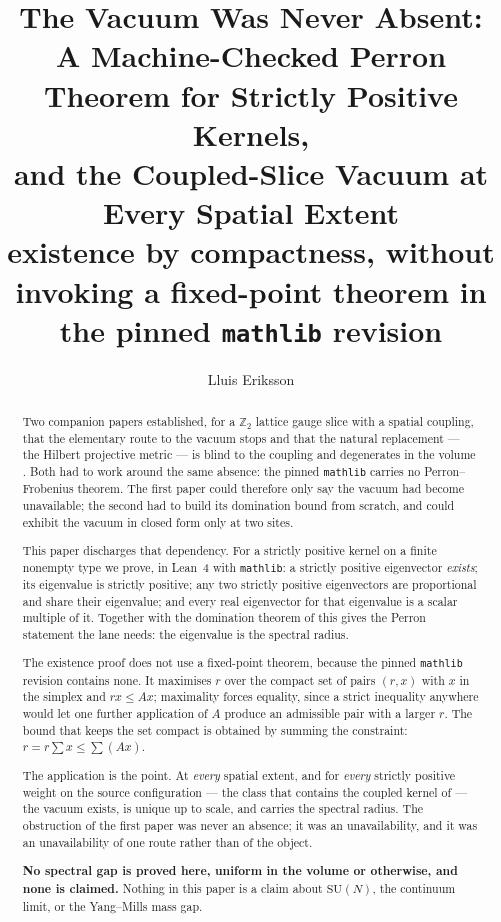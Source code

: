\documentclass[11pt]{article}
\title{The Vacuum Was Never Absent:\\
A Machine-Checked Perron Theorem for Strictly Positive Kernels,\\
and the Coupled-Slice Vacuum at Every Spatial Extent\\
\large existence by compactness, without invoking a fixed-point theorem
in the pinned \texttt{mathlib} revision}
\author{Lluis Eriksson}
\date{}
\theoremstyle{definition}
\newcommand{\Z}{\mathbb{Z}}
\newcommand{\SU}{\mathrm{SU}}
\begin{document}
\maketitle

\begin{abstract}
Two companion papers established, for a $\Z_2$ lattice gauge slice with a
spatial coupling, that the elementary route to the vacuum stops
\cite{ErikssonSpatial} and that the natural replacement --- the Hilbert
projective metric --- is blind to the coupling and degenerates in the volume
\cite{ErikssonBirkhoff}.  Both had to work around the same absence: the pinned
\texttt{mathlib} carries no Perron--Frobenius theorem.  The first paper could
therefore only say the vacuum had become unavailable; the second had to build
its domination bound from scratch, and could exhibit the vacuum in closed form
only at two sites.

This paper discharges that dependency.  For a strictly positive kernel on a
finite nonempty type we prove, in Lean~4 with \texttt{mathlib}: a strictly
positive eigenvector \emph{exists}; its eigenvalue is strictly positive; any two
strictly positive eigenvectors are proportional and share their eigenvalue; and
every real eigenvector for that eigenvalue is a scalar multiple of it.  Together
with the domination theorem of \cite{ErikssonBirkhoff} this gives the
Perron statement the lane needs: the eigenvalue is the spectral radius.

The existence proof does not use a fixed-point theorem, because the pinned
\texttt{mathlib} revision contains none.  It maximises $r$ over the compact set of pairs $(r,x)$ with $x$ in the
simplex and $rx\le Ax$; maximality forces equality, since a strict inequality
anywhere would let one further application of $A$ produce an admissible pair with
a larger $r$.  The bound that keeps the set compact is obtained by summing the
constraint: $r=r\sum x\le\sum(Ax)$.

The application is the point.  At \emph{every} spatial extent, and for
\emph{every} strictly positive weight on the source configuration --- the class
that contains the coupled kernel of \cite{ErikssonSpatial} --- the vacuum exists,
is unique up to scale, and carries the spectral radius.  The obstruction of the
first paper was never an absence; it was an unavailability, and it was an
unavailability of one route rather than of the object.

\textbf{No spectral gap is proved here, uniform in the volume or otherwise, and
none is claimed.}  Nothing in this paper is a claim about $\SU(N)$, the
continuum limit, or the Yang--Mills mass gap.
\end{abstract}
\end{document}
